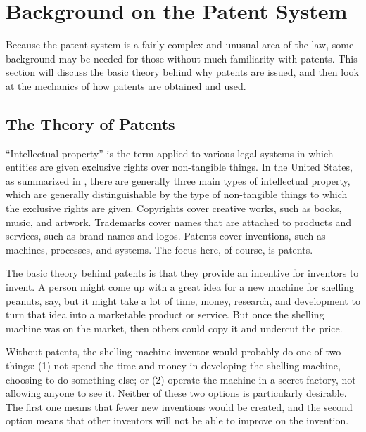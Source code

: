 \documentclass[11pt,twocolumn,titlepage]{article}
\begin{document}
\section{Background on the Patent System}

Because the patent system is a fairly complex and unusual area of the law, some
background may be needed for those without much familiarity with patents. This
section will discuss the basic theory behind why patents are issued, and then
look at the mechanics of how patents are obtained and used.

\subsection{The Theory of Patents}
\SectionNote

``Intellectual property'' is the term applied to various legal systems in which
entities are given exclusive rights over non-tangible things. In the United
States, as summarized in ,
there are generally three main types of intellectual property, which are
generally distinguishable by the type of non-tangible things to which the
exclusive rights are given. Copyrights cover creative works, such as books,
music, and artwork. Trademarks cover names that are attached to
products and services, such as brand names and logos. Patents cover inventions,
such as machines, processes, and systems. The focus here, of course, is patents.

The basic theory behind patents is that they provide an incentive for inventors
to invent. A person might come up with a great idea for a new machine for
shelling peanuts, say, but it might take a lot of time, money, research, and
development to turn that idea into a marketable product or service. But once the
shelling machine was on the market, then others could copy it and undercut the
price.

Without patents, the shelling machine inventor would probably do one of
two things: (1) not spend the time and money in developing the shelling
machine, choosing to do something else; or (2) operate the machine in a secret
factory, not allowing anyone to see it. Neither of these two options is
particularly desirable. The first one means that fewer new
inventions would be
created, and the second option means that other inventors will not be able to
improve on the invention.
\end{document}
